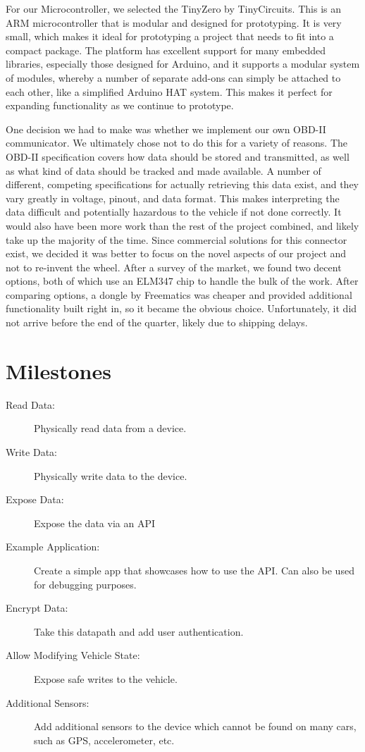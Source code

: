 \documentclass[10pt,letterpaper,unboxed,cm]{article}
\begin{document}
For our Microcontroller, we selected the TinyZero by TinyCircuits. This is an ARM microcontroller that is modular and designed for prototyping. It is very small, which makes it ideal for prototyping a project that needs to fit into a compact package. The platform has excellent support for many embedded libraries, especially those designed for Arduino, and it supports a modular system of  modules, whereby a number of separate add-ons can simply be attached to each other, like a simplified Arduino HAT system. This makes it perfect for expanding functionality as we continue to prototype.

One decision we had to make was whether we implement our own OBD-II communicator. We ultimately chose not to do this for a variety of reasons. The OBD-II specification covers how data should be stored and transmitted, as well as what kind of data should be tracked and made available. A number of different, competing specifications for actually retrieving this data exist, and they vary greatly in voltage, pinout, and data format. This makes interpreting the data difficult and potentially hazardous to the vehicle if not done correctly. It would also have been more work than the rest of the project combined, and likely take up the majority of the time. Since commercial solutions for this connector exist, we decided it was better to focus on the novel aspects of our project and not to re-invent the wheel. After a survey of the market, we found two decent options, both of which use an ELM347 chip to handle the bulk of the work. After comparing options, a dongle by Freematics was cheaper and provided additional functionality built right in, so it became the obvious choice. Unfortunately, it did not arrive before the end of the quarter, likely due to shipping delays.

\newpage
\section{Milestones}

\begin{description}

\item [Read Data:] Physically read data from a device.
\item [Write Data:] Physically write data to the device.
\item [Expose Data:] Expose the data via an API
\item [Example Application:] Create a simple app that showcases how to use the API. Can also be used for debugging purposes.
\item [Encrypt Data:] Take this datapath and add user authentication.
\item [Allow Modifying Vehicle State:] Expose safe writes to the vehicle.
\item [Additional Sensors:] Add additional sensors to the device which cannot be found on many cars, such as GPS, accelerometer, etc.

\end{description}
\end{document}
